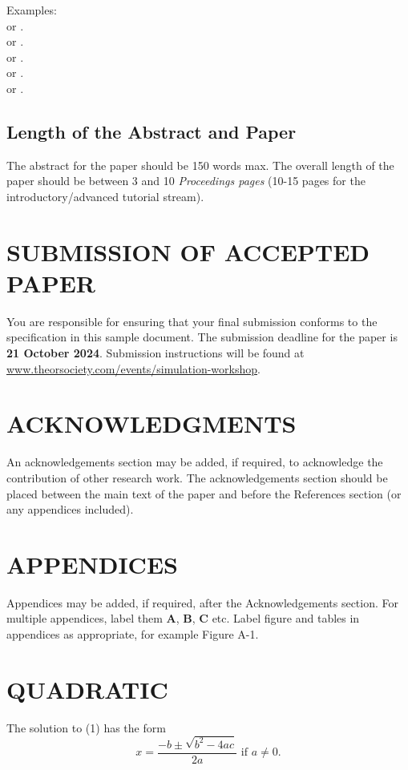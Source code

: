 \documentclass{swpaperproc}
\theoremstyle{sw}
\begin{document}
Examples: \\
 or \cite{chen10}.\\
 or \cite{glover97}.\\
 or \cite{mourtos03}.\\
 or \cite{osman95}.\\
 or \cite{ryan06}.


\subsection{Length of the Abstract and Paper}
The abstract for the paper should be 150 words max. The overall length of the paper should be between 3 and 10 {\em Proceedings pages} (10-15 pages for the introductory/advanced tutorial stream).

\section{SUBMISSION OF ACCEPTED PAPER}

You are responsible for ensuring that your final submission conforms to the specification in this
sample document. The submission deadline for the paper is {\bf 21 October 2024}. Submission
instructions will be found at \href{https://www.theorsociety.com/ORS/Events/2025/Simulation-Workshop/SW25-Main.aspx?EventKey=SW25&WebsiteKey=c1745213-aec0-45e5-a960-0ec98ebabd4e}{www.theorsociety.com/events/simulation-workshop}.

\section*{ACKNOWLEDGMENTS}
An acknowledgements section may be added, if required, to acknowledge the contribution of
other research work. The acknowledgements section should be placed between the main text of
the paper and before the References section (or any appendices included).

\appendix

\section{APPENDICES} \label{app:quadratic}
Appendices may be added, if required, after the Acknowledgements section. For multiple appendices, label them \textbf{A}, \textbf{B}, \textbf{C} etc. Label figure and tables in appendices as appropriate, for example Figure A-1.

\section{QUADRATIC}
The solution to (1) has the form
\begin{equation} \label{eq: quadratic sol}
x = \frac{-b \pm \sqrt{b^2-4ac}}{2a} \mbox{ if } a \ne 0.
\end{equation}
\end{document}
